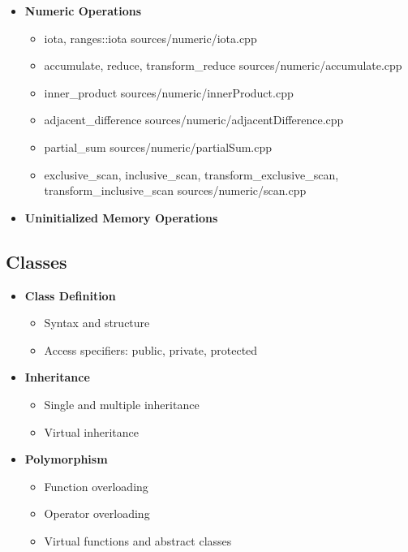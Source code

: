 \documentclass{article}
\begin{document}
\begin{itemize}
\begin{itemize}
               {sources/permutation/permutation.cpp}
          \end{itemize}
        \item \textbf{Numeric Operations}
          \begin{itemize}
            \item iota, ranges::iota
               {sources/numeric/iota.cpp}
            \item accumulate, reduce, transform\_reduce
               {sources/numeric/accumulate.cpp}
            \item inner\_product
               {sources/numeric/innerProduct.cpp}
            \item adjacent\_difference
               {sources/numeric/adjacentDifference.cpp}
            \item partial\_sum
               {sources/numeric/partialSum.cpp}
            \item exclusive\_scan, inclusive\_scan, transform\_exclusive\_scan, transform\_inclusive\_scan
               {sources/numeric/scan.cpp}
          \end{itemize}
        \item \textbf{Uninitialized Memory Operations}
      \end{itemize}
    \subsection{Classes}
      \begin{itemize}
        \item \textbf{Class Definition}
          \begin{itemize}
            \item Syntax and structure
            \item Access specifiers: public, private, protected
          \end{itemize}
        \item \textbf{Inheritance}
          \begin{itemize}
            \item Single and multiple inheritance
            \item Virtual inheritance
          \end{itemize}
        \item \textbf{Polymorphism}
          \begin{itemize}
            \item Function overloading
            \item Operator overloading
            \item Virtual functions and abstract classes
          \end{itemize}
      \end{itemize}
\end{document}
